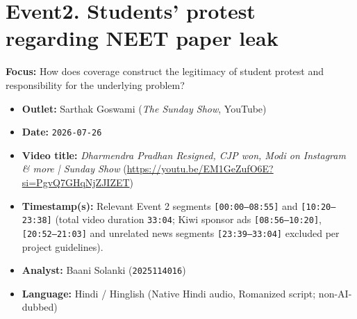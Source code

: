 \documentclass[10pt,a4paper]{article}
\begin{document}
\section*{Event2. Students' protest regarding NEET paper leak}
\textbf{Focus:} How does coverage construct the legitimacy of student protest and responsibility for the underlying problem?

\begin{itemize}[leftmargin=1.5em, itemsep=3pt, topsep=4pt]
  \item \textbf{Outlet:} Sarthak Goswami (\textit{The Sunday Show}, YouTube)
  \item \textbf{Date:} \texttt{2026-07-26}
  \item \textbf{Video title:} \textit{Dharmendra Pradhan Resigned, CJP won, Modi on Instagram \& more | Sunday Show} (\url{https://youtu.be/EM1GeZufO6E?si=PgvQ7GHqNjZJIZET})
  \item \textbf{Timestamp(s):} Relevant Event 2 segments \texttt{[00:00--08:55]} and \texttt{[10:20--23:38]} (total video duration \texttt{33:04}; Kiwi sponsor ads \texttt{[08:56--10:20]}, \texttt{[20:52--21:03]} and unrelated news segments \texttt{[23:39--33:04]} excluded per project guidelines).
  \item \textbf{Analyst:} Baani Solanki (\texttt{2025114016})
  \item \textbf{Language:} Hindi / Hinglish (Native Hindi audio, Romanized script; non-AI-dubbed)
\end{itemize}
\end{document}
